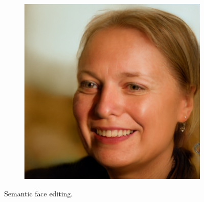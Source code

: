 \begin{figure}[h!]
\begin{subfigure}[b]{0.24\textwidth}
    \end{subfigure}
    \begin{subfigure}[b]{0.24\textwidth}
        \includegraphics[width=\textwidth]{fig/stylegan/faceedit/uffe-gender}

    \end{subfigure}
    \caption{Semantic face editing.}
    \label{faceedit}
\end{figure}
